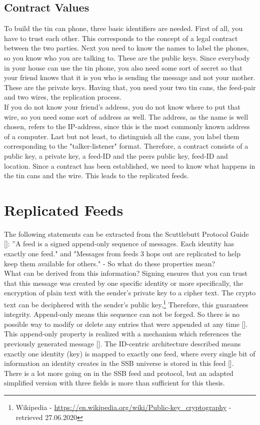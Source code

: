 \subsection{Contract Values}
To build the tin can phone, three basic identifiers are needed. First of all, you have to trust each other. This corresponds to the concept of a legal contract between the two parties. Next you need to know the names to label the phones, so you know who you are talking to. These are the public keys. Since everybody in your house can use the tin phone, you also need some sort of secret so that your friend knows that it is you who is sending the message and not your mother. These are the private keys. Having that, you need your two tin cans, the feed-pair and two wires, the replication process.
\\
If you do not know your friend’s address, you do not know where to put that wire, so you need some sort of address as well. The address, as the name is well chosen, refers to the IP-address, since this is the most commonly known address of a computer. Last but not least, to distinguish all the cans, you label them corresponding to the "talker-listener" format. Therefore, a contract consists of a public key, a private key, a feed-ID and the peers public key, feed-ID and location. Since a contract has been established, we need to know what happens in the tin cans and the wire. This leads to the replicated feeds. 



\section{Replicated Feeds}
The following statements can be extracted from the Scuttlebutt Protocol Guide []: ”A feed is a signed append-only sequence of messages. Each identity has exactly one feed." and "Messages from feeds 3 hops out are replicated to help keep them available for others." - So what do these properties mean?\\

What can be derived from this information? Signing ensures that you can trust that this message was created by one specific identity or more specifically, the encryption of plain text with the sender’s private key to a cipher text. The crypto text can be deciphered with the sender’s public key.\footnote{Wikipedia - \url{https://en.wikipedia.org/wiki/Public-key_cryptography} - retrieved 27.06.2020} Therefore, this guarantees integrity. Append-only means this sequence can not be forged. So there is no possible way to modify or delete any entries that were appended at any time []. This append-only property is realized with a mechanism which references the previously generated message []. The ID-centric architecture described means exactly one identity (key) is mapped to exactly one feed, where every single bit of information an identity creates in the SSB universe is stored in this feed [].
\\
There is a lot more going on in the SSB feed and protocol, but an adapted simplified version with three fields is more than sufficient for this thesis. 

